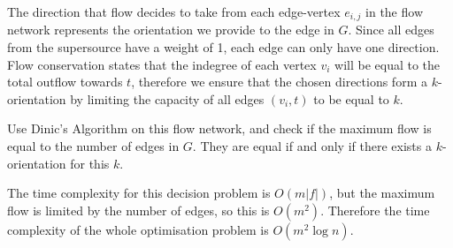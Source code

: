 \documentclass{article}
\begin{document}
\begin{solution}
\begin{center}
    \end{center}

    The direction that flow decides to take from each edge-vertex $e_{i,j}$ in the flow network represents 
    the orientation we provide to the edge in $G$. 
    Since all edges from the supersource have a weight of 1, each edge can only have one direction.
    Flow conservation states that the indegree of each vertex $v_i$ will be equal to 
    the total outflow towards $t$, therefore we ensure that the chosen directions form a $k$-orientation by 
    limiting the capacity of all edges $(v_i, t)$ to be equal to $k$.

    Use Dinic's Algorithm on this flow network, and check if the maximum flow is equal to 
    the number of edges in $G$. They are equal if and only if there exists a $k$-orientation for this $k$.

    The time complexity for this decision problem is $O(m|f|)$, but the maximum flow is limited by the number of edges, 
    so this is $O(m^2)$. Therefore the time complexity of the whole optimisation problem is $O(m^2 \log n)$.



\end{solution}
\end{document}
